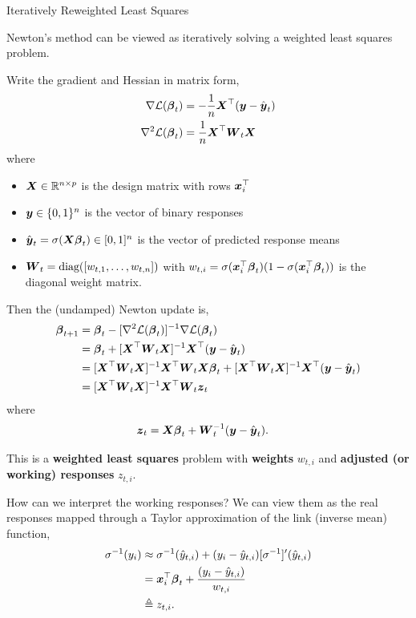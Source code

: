 \documentclass[aspectratio=169]{beamer}
\begin{document}
\begin{frame}[t,allowframebreaks]{Iteratively Reweighted Least
Squares}\label{iteratively-reweighted-least-squares}


Newton's method can be viewed as iteratively solving a weighted least squares
problem. 

Write the gradient and Hessian in matrix form, \begin{align*}
\nabla \mathcal{L}(\boldsymbol{\beta}_t) &= -\frac{1}{n} \boldsymbol{X}^\top (\boldsymbol{y} - \hat{\boldsymbol{y}}_t) \\
\nabla^2 \mathcal{L}(\boldsymbol{\beta}_t) &= \frac{1}{n} \boldsymbol{X}^\top \boldsymbol{W}_t \boldsymbol{X}
\end{align*} 
where 
\begin{itemize}
    \item \(\boldsymbol{X} \in \mathbb{R}^{n \times p}\) is the design
matrix with rows \(\boldsymbol{x}_i^\top\) 
    \item \(\boldsymbol{y} \in \{0,1\}^n\) is the vector
of binary responses 
    \item \(\hat{\boldsymbol{y}}_t = \sigma(\boldsymbol{X} \boldsymbol{\beta}_t) \in [0,1]^n\) is the vector of
predicted response means 
    \item \(\boldsymbol{W}_t = \textrm{diag}([w_{t,1}, \ldots, w_{t,n}])\) with
\(w_{t,i} = \sigma(\boldsymbol{x}_i^\top \boldsymbol{\beta}_t) (1- \sigma(\boldsymbol{x}_i^\top \boldsymbol{\beta}_t))\)
is the diagonal weight matrix.
\end{itemize}

Then the (undamped) Newton update is, \begin{align*}
\boldsymbol{\beta}_{t+1} 
&= \boldsymbol{\beta}_t - [\nabla^2 \mathcal{L}(\boldsymbol{\beta}_t)]^{-1} \nabla \mathcal{L}(\boldsymbol{\beta}_t) \\
&= \boldsymbol{\beta}_t + [\boldsymbol{X}^\top \boldsymbol{W}_t \boldsymbol{X}]^{-1} \boldsymbol{X}^\top (\boldsymbol{y} - \hat{\boldsymbol{y}}_t) \\
&= [\boldsymbol{X}^\top \boldsymbol{W}_t \boldsymbol{X}]^{-1} \boldsymbol{X}^\top \boldsymbol{W}_t \boldsymbol{X} \boldsymbol{\beta}_t + [\boldsymbol{X}^\top \boldsymbol{W}_t \boldsymbol{X}]^{-1} \boldsymbol{X}^\top (\boldsymbol{y} - \hat{\boldsymbol{y}}_t) \\
&= [\boldsymbol{X}^\top \boldsymbol{W}_t \boldsymbol{X}]^{-1} \boldsymbol{X}^\top \boldsymbol{W}_t \boldsymbol{z}_t
\end{align*} 
where 
\begin{align*}
\boldsymbol{z}_t &= \boldsymbol{X} \boldsymbol{\beta}_t + \boldsymbol{W}_t^{-1} (\boldsymbol{y} - \hat{\boldsymbol{y}}_t).
\end{align*} 

This is a \textbf{weighted least squares} problem with \textbf{weights}
\(w_{t,i}\) and \textbf{adjusted (or working) responses} \(z_{t,i}\).

How can we interpret the working responses? We can view them as the real
responses mapped through a Taylor approximation of the link (inverse
mean) function, 
\begin{align*}
\sigma^{-1}(y_i) 
&\approx \sigma^{-1}(\hat{y}_{t,i}) + (y_i - \hat{y}_{t,i}) [\sigma^{-1}]'(\hat{y}_{t,i}) \\
&= \boldsymbol{x}_i^\top \boldsymbol{\beta}_t + \frac{(y_i - \hat{y}_{t,i})}{w_{t,i}} \\
&\triangleq z_{t,i}.
\end{align*}
\end{frame}
\end{document}
